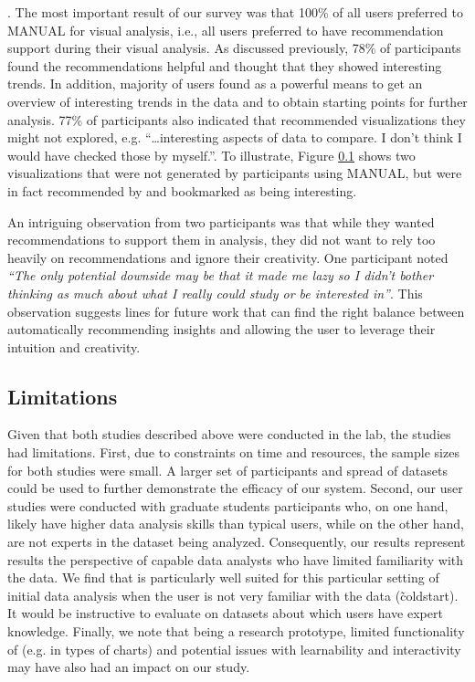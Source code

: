 . 
The most important result of our survey was that 100\% of all users preferred \SeeDB to MANUAL for
visual analysis, i.e., all users preferred to have recommendation support during their visual analysis.
As discussed previously, 78\% of participants found the recommendations helpful and thought that they
showed interesting trends.
In addition, majority of users found \SeeDB as a powerful means to get an overview of interesting trends
in the data and to obtain starting points for further analysis.
77\% of participants also indicated that \SeeDB recommended visualizations they might not explored, e.g.
``\ldots interesting aspects of data to compare. I don't think I would have checked those by myself.''.
To illustrate, Figure \ref{} shows two visualizations that were not generated by participants using MANUAL,
but were in fact recommended by \SeeDB and bookmarked as being interesting.

An intriguing observation from two participants was that while they wanted recommendations to support them
in analysis, they did not want to rely too heavily on recommendations and ignore their creativity.
One participant noted {\em ``The only potential downside may be that it made 
me lazy so I didn't bother thinking as much about what I really could study or be interested in''}.
This observation suggests lines for future work that can find the right balance between automatically 
recommending insights and allowing the user to leverage their intuition and creativity.

\subsection{Limitations}
Given that both studies described above were conducted in the lab, the studies had limitations.
First, due to constraints on time and resources, the sample sizes for both studies were small.
A larger set of participants and spread of datasets could be used to further demonstrate the
efficacy of our system.
Second, our user studies were conducted with graduate students participants who, on one hand, 
likely have higher data analysis skills than typical users, while on the other hand, are 
not experts in the dataset being analyzed.
Consequently, our results represent results the perspective of capable data analysts who 
have limited familiarity with the data.
We find that \SeeDB is particularly well suited for this particular setting of initial data 
analysis when the user is not very familiar with the data (\~ coldstart).
It would be instructive to evaluate \SeeDB on datasets about which users have expert knowledge.
Finally, we note that being a research prototype, limited functionality of \SeeDB (e.g. in types of
charts) and potential issues with learnability and interactivity may have also had an impact on
our study.

